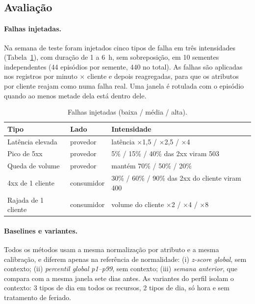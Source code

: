 \documentclass[sigconf,nonacm]{acmart}
\begin{document}
\subsection{Avaliação}

\paragraph{Falhas injetadas.} Na semana de teste foram injetados cinco tipos de falha em três intensidades (Tabela~\ref{tab:falhas}), com duração de 1 a 6~h, sem sobreposição, em 10 sementes independentes (44 episódios por semente, 440 no total). As falhas são aplicadas nos registros por minuto $\times$ cliente e depois reagregadas, para que os atributos por cliente reajam como numa falha real. Uma janela é rotulada com o episódio quando ao menos metade dela está dentro dele.

\begin{table}[t]
  \caption{Falhas injetadas (baixa / média / alta).}
  \label{tab:falhas}
  \small
  \begin{tabular}{p{}p{}p{}}
    \toprule
    Tipo & Lado & Intensidade \\
    \midrule
    Latência elevada & provedor & latência $\times$1,5 / $\times$2,5 / $\times$4 \\
    Pico de 5xx & provedor & 5\% / 15\% / 40\% das 2xx viram 503 \\
    Queda de volume & provedor & mantém 70\% / 50\% / 20\% \\
    4xx de 1 cliente & consumidor & 30\% / 60\% / 90\% das 2xx do cliente viram 400 \\
    Rajada de 1 cliente & consumidor & volume do cliente $\times$2 / $\times$4 / $\times$8 \\
    \bottomrule
  \end{tabular}
\end{table}

\paragraph{Baselines e variantes.} Todos os métodos usam a mesma normalização por atributo e a mesma calibração, e diferem apenas na referência de normalidade: (i) \emph{z-score global}, sem contexto; (ii) \emph{percentil global p1--p99}, sem contexto; (iii) \emph{semana anterior}, que compara com a mesma janela sete dias antes. As variantes do perfil isolam o contexto: 3 tipos de dia em todos os recursos, 2 tipos de dia, só hora e sem tratamento de feriado.
\end{document}
